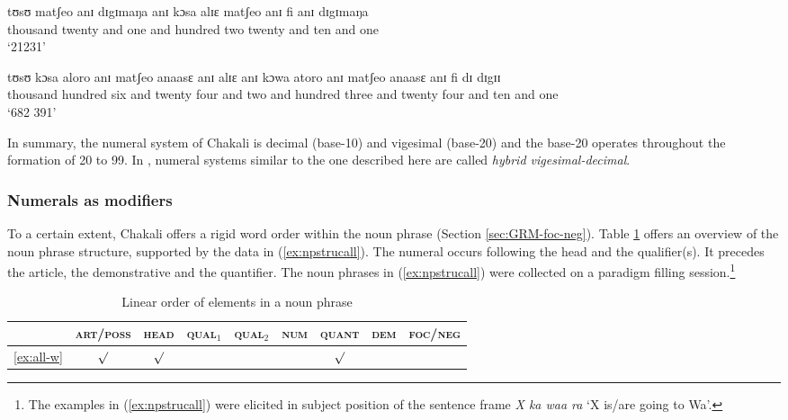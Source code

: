 \begin{exe}
\begin{exe}
\begin{exe}
{\begin{exe}
\begin{exe}
\begin{exe}
\begin{exe}
\begin{exe}
\begin{exe}
\begin{exe}
\begin{xlist}
\begin{exe}
\begin{exe}
\begin{exe}
\ex\label{ex:21231}
\gll tʊsʊ  matʃeo   anɪ  dɪgɪmaŋa    anɪ  kɔsa  alɪɛ  matʃeo  anɪ  fi  anɪ  
dɪgɪmaŋa    \\
       {thousand}   {twenty}   {and} {one}  {and}  {hundred}  {two}  {twenty} 
{and} {ten} {and} {one}\\
\glt `21231'

\ex\label{ex:692381}
\gll tʊsʊ kɔsa aloro anɪ matʃeo anaasɛ anɪ alɪɛ anɪ kɔwa atoro anɪ matʃeo anaasɛ
anɪ fi dɪ dɪgɪɪ \\
{thousand} {hundred} {six} {and} {twenty} {four} {and} {two} {and} {hundred}
{three} {and} {twenty} {four} {and} {ten} {and} {one}\\
\glt `682 391'

\z
\z

In summary,  the 
numeral system of Chakali is decimal (base-10) and vigesimal (base-20) and the 
base-20  operates throughout the formation of 20 to 99. In
\citet{Comr08}, numeral systems similar to the one described here are called
\textit{hybrid vigesimal-decimal}. 


\subsubsection{Numerals as modifiers}
\label{sec:NUM-npstruc}

To a certain extent, Chakali offers a rigid word order within the noun
phrase (Section \ref{sec:GRM-foc-neg}). Table \ref{tab:npstruc}
offers an overview of the noun phrase structure, supported by the data in
(\ref{ex:npstrucall}). The numeral occurs following  the head and the
qualifier(s). It precedes the article, the demonstrative and the
quantifier.  The noun phrases in  (\ref{ex:npstrucall}) were
collected on a paradigm filling session.\footnote{The examples in
(\ref{ex:npstrucall}) were elicited in subject position of the sentence frame
{\it X ka waa ra} `X is/are going to Wa'.}
 


\begin{table}[!h]
 \caption{Linear order of elements in a noun phrase \label{tab:npstruc}}
  \centering
\small
  \begin{tabular}{lcccccccc}
    \lsptoprule

&\textsc{art/poss}&\textsc{head}&\textsc{qual$_\textrm{1}$}&\textsc{
qual$_\textrm{2}$} &\textsc {num} & 
\textsc{quant} &  \textsc{dem} &  \textsc{foc/neg} \\
\midrule
\ref{ex:all-w}& $\surd$ &$\surd$ &&&&$\surd$ &&\\


\end{tabular}
\end{table}
\end{exe}
\end{exe}
\end{exe}
\end{xlist}
\end{exe}
\end{exe}
\end{exe}
\end{exe}
\end{exe}
\end{exe}
\end{exe}}
\end{exe}
\end{exe}
\end{exe}
